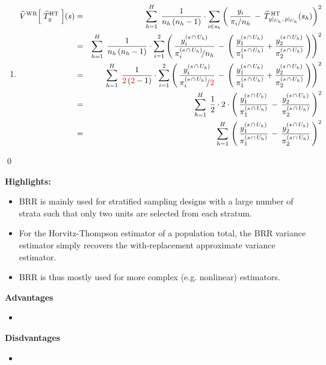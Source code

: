 \begin{enumerate}
\item
	\begin{eqnarray*}
	\widehat{V}^{\textnormal{WR}}\!\left[\;\widehat{T}^{\textnormal{HT}}_{y}\;\right]\!(s)
	& = &
		\overset{H}{\underset{h = 1}{\sum}}\;\,
		\dfrac{1}{n_{h}\,(n_{h}-1)}\cdot\underset{i \in s_{h}}{\sum}
			\left(\,
			\dfrac{y_{i}}{\pi_{i}/n_{h}}\,-\,\widehat{T}^{\,\textnormal{HT}}_{y\vert_{U_{h}},\,p\vert_{U_{h}}}(s_{h})
			\right)^{2}
	\\
	& = &
		\overset{H}{\underset{h = 1}{\sum}}\;\,
		\dfrac{1}{n_{h}\,(n_{h}-1)}\cdot\overset{2}{\underset{i = 1}{\sum}}
			\left(\,
			\dfrac{y^{(s\,\cap\,U_{h})}_{i}}{\pi^{(s\,\cap\,U_{h})}_{i}\!/n_{h}}\,-\,
			\left(\,
				\dfrac{y^{(s\,\cap\,U_{h})}_{1}}{\pi^{(s\,\cap\,U_{h})}_{1}}
				+
				\dfrac{y^{(s\,\cap\,U_{h})}_{2}}{\pi^{(s\,\cap\,U_{h})}_{2}}
				\,\right)
			\right)^{2}
	\\
	& = &
		\overset{H}{\underset{h = 1}{\sum}}\;\,
		\dfrac{1}{{\color{red}2}\,({\color{red}2}-1)}\cdot\overset{2}{\underset{i = 1}{\sum}}
			\left(\,
			\dfrac{y^{(s\,\cap\,U_{h})}_{i}}{\pi^{(s\,\cap\,U_{h})}_{i}\!/{\color{red}2}}\,-\,
			\left(\,
				\dfrac{y^{(s\,\cap\,U_{h})}_{1}}{\pi^{(s\,\cap\,U_{h})}_{1}}
				+
				\dfrac{y^{(s\,\cap\,U_{h})}_{2}}{\pi^{(s\,\cap\,U_{h})}_{2}}
				\,\right)
			\right)^{2}
	\\
	& = &
		\overset{H}{\underset{h = 1}{\sum}}\;\,
		\dfrac{1}{2} \cdot 2 \cdot
		\left(\,
			\dfrac{y^{(s\,\cap\,U_{h})}_{1}}{\pi^{(s\,\cap\,U_{h})}_{1}}
			\,-\,
			\dfrac{y^{(s\,\cap\,U_{h})}_{2}}{\pi^{(s\,\cap\,U_{h})}_{2}}
			\,\right)^{2}
	\\
	& = &
		\overset{H}{\underset{h = 1}{\sum}}\,
		\left(\,
			\dfrac{y^{(s\,\cap\,U_{h})}_{1}}{\pi^{(s\,\cap\,U_{h})}_{1}}
			\,-\,
			\dfrac{y^{(s\,\cap\,U_{h})}_{2}}{\pi^{(s\,\cap\,U_{h})}_{2}}
			\,\right)^{2}
	\end{eqnarray*}
\end{enumerate}
\qed

\vskip 0.5cm
\textbf{Highlights:}
\begin{itemize}
\item
	BRR is mainly used for stratified sampling designs
	with a large number of strata such that only
	two units are selected from each stratum.
\item
	For the Horvitz-Thompson estimator of a population total,
	the BRR variance estimator simply recovers the
	with-replacement approximate variance estimator.
\item
	BRR is thus mostly used for more complex (e.g. nonlinear) estimators.
\end{itemize}

\vskip 0.5cm
\noindent
\textbf{Advantages}
\begin{itemize}
\item

\end{itemize}

\vskip 0.5cm
\noindent
\textbf{Disdvantages}
\begin{itemize}
\item

\end{itemize}

